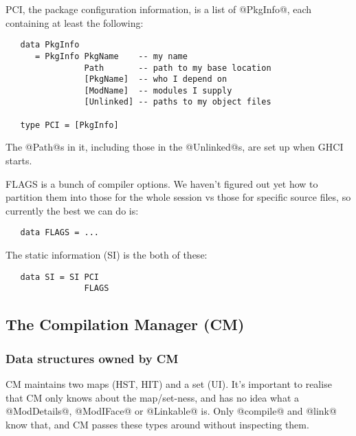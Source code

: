 \documentclass[11pt]{article}
\begin{document}
PCI, the package configuration information, is a list of @PkgInfo@,
each containing at least the following:
\begin{verbatim}
   data PkgInfo
      = PkgInfo PkgName    -- my name
                Path       -- path to my base location
                [PkgName]  -- who I depend on
                [ModName]  -- modules I supply
                [Unlinked] -- paths to my object files

   type PCI = [PkgInfo]
\end{verbatim}
The @Path@s in it, including those in the @Unlinked@s, are set up
when GHCI starts.  

FLAGS is a bunch of compiler options.  We haven't figured out yet how
to partition them into those for the whole session vs those for
specific source files, so currently the best we can do is:
\begin{verbatim}
   data FLAGS = ...
\end{verbatim}

The static information (SI) is the both of these:
\begin{verbatim}
   data SI = SI PCI
                FLAGS
\end{verbatim}



\subsection{The Compilation Manager (CM)}
\label{sec:manager}

\subsubsection{Data structures owned by CM}

CM maintains two maps (HST, HIT) and a set (UI).  It's important to
realise that CM only knows about the map/set-ness, and has no idea
what a @ModDetails@, @ModIFace@ or @Linkable@ is.  Only @compile@ and
@link@ know that, and CM passes these types around without
inspecting them.
\end{document}
